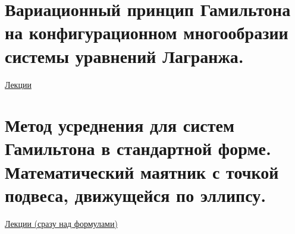 \documentclass[specialist, subf, href, colorlinks=true, 12pt, times, mtpro, final]{disser}
\theoremstyle{definition}
\begin{document}
    \section{Вариационный принцип Гамильтона на конфигурационном многообразии системы уравнений Лагранжа.}
     \label{25}
    \hyperlink {lects.45}{Лекции} \\
    
    \section{Метод усреднения для систем Гамильтона в стандартной форме. Математический маятник с точкой подвеса, движущейся по эллипсу.}
     \label{26}
    \hyperlink {lects.47}{Лекции (сразу над формулами)} \\
    
    
    
\end{document}
